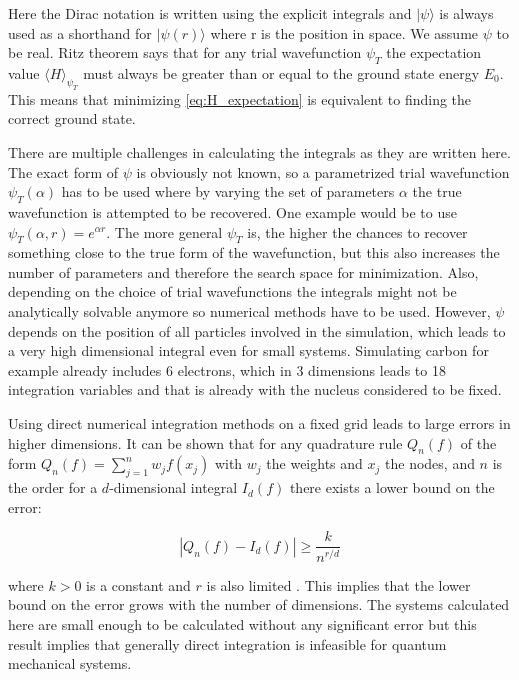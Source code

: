 \documentclass[a4paper, 11pt]{article}          %
\begin{document}
    Here the Dirac notation is written using the explicit integrals and $|\psi \rangle$ is always used as a shorthand for $|\psi(r)\rangle$ where r is the position in space. We assume $\psi$ to be real. Ritz theorem says that for any trial wavefunction $\psi_T$ the expectation value $\langle H \rangle_{\psi_T}$ must always be greater than or equal to the ground state energy $E_0$. This means that minimizing \eqref{eq:H_expectation} is equivalent to finding the correct ground state.

    There are multiple challenges in calculating the integrals as they are written here. The exact form of $\psi$ is obviously not known, so a parametrized trial wavefunction $\psi_T(\alpha)$ has to be used where by varying the set of parameters $\alpha$ the true wavefunction is attempted to be recovered. One example would be to use $\psi_T(\alpha, r) = e^{\alpha r}$. The more general $\psi_T$ is, the higher the chances to recover something close to the true form of the wavefunction, but this also increases the number of parameters and therefore the search space for minimization. Also, depending on the choice of trial wavefunctions the integrals might not be analytically solvable anymore so numerical methods have to be used. However, $\psi$ depends on the position of all particles involved in the simulation, which leads to a very high dimensional integral even for small systems. Simulating carbon for example already includes 6 electrons, which in 3 dimensions leads to 18 integration variables and that is already with the nucleus considered to be fixed.

    Using direct numerical integration methods on a fixed grid leads to large errors in higher dimensions. It can be shown that for any quadrature rule $Q_n(f)$ of the form $Q_n(f)=\sum_{j=1}^n w_j f(x_j)$ with $w_j$ the weights and $x_j$ the nodes, and $n$ is the order for a $d$-dimensional integral $I_d(f)$ there exists a lower bound on the error:

    \begin{equation*}
        |Q_n(f) - I_d(f)| \geq \frac{k}{n^{r/d}}
    \end{equation*}

    where $k > 0$ is a constant and $r$ is also limited \cite{nm2}. This implies that the lower bound on the error grows with the number of dimensions. The systems calculated here are small enough to be calculated without any significant error but this result implies that generally direct integration is infeasible for quantum mechanical systems.
\end{document}

